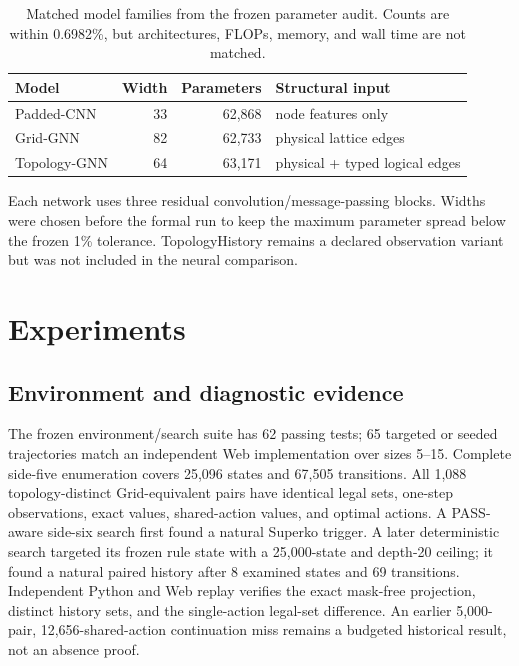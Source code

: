 \documentclass[10pt,letterpaper]{article}
\begin{document}
\begin{table}[H]
  \centering
  \caption{Matched model families from the frozen parameter audit. Counts are
  within 0.6982\%, but architectures, FLOPs, memory, and wall time are not
  matched.}
  \label{tab:model-parameters}
  \begin{tabular}{lrrl}
    \toprule
    Model & Width & Parameters & Structural input \\
    \midrule
    Padded-CNN & 33 & 62,868 & node features only \\
    Grid-GNN & 82 & 62,733 & physical lattice edges \\
    Topology-GNN & 64 & 63,171 & physical + typed logical edges \\
    \bottomrule
  \end{tabular}
\end{table}

Each network uses three residual convolution/message-passing blocks. Widths
were chosen before the formal run to keep the maximum parameter spread below
the frozen 1\% tolerance. TopologyHistory remains a declared observation
variant but was not included in the neural comparison.

\section{Experiments}
\label{sec:experiments}

\subsection{Environment and diagnostic evidence}

The frozen environment/search suite has 62 passing tests; 65 targeted or seeded
trajectories match an independent Web implementation over sizes 5--15.
Complete side-five enumeration covers 25,096 states and 67,505 transitions.
All 1,088 topology-distinct Grid-equivalent pairs have identical legal sets,
one-step observations, exact values, shared-action values, and optimal actions.
A PASS-aware side-six search first found a natural Superko trigger. A later
deterministic search targeted its frozen rule state with a 25,000-state and
depth-20 ceiling; it found a natural paired history after 8 examined states
and 69 transitions. Independent Python and Web replay verifies the exact
mask-free projection, distinct history sets, and the single-action legal-set
difference. An earlier 5,000-pair, 12,656-shared-action continuation miss
remains a budgeted historical result, not an absence proof.
\end{document}
